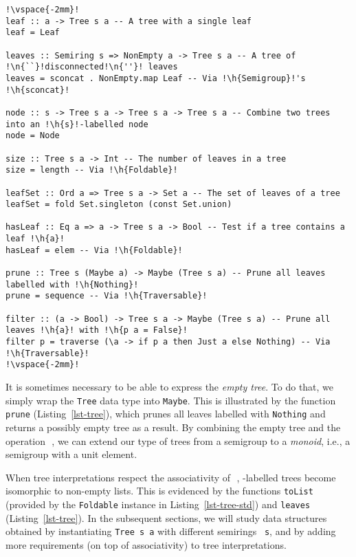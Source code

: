 \documentclass[crc,english]{programming}
\newcommand{\code}[1]{\lstinline[mathescape]|#1|}
\newcommand{\hcode}[1]{{\color{darkblue} \lstinline[keywordstyle={}]|#1|}} %
\newcommand{\h}[1]{{\itshape\color{grayblue}#1}} %
\newcommand{\n}[1]{{\itshape\color{graygreen}#1}} %
\newcommand{\zero}{\raisebox{-0.2mm}{\textcircled{\textsf{0}}}\xspace}
\newcommand{\dia}{\,\text{\raisebox{-0.3mm}{\Large $\diamond$}}\,}
\begin{document}
\begin{lstlisting}[float,label=lst-tree,xleftmargin=0pt,belowskip=-2mm,caption={
    A basic API for constructing and manipulating trees. We use the standard
    module \code{Data.L}\code{ist.N}\code{onEmpty} for representing non-empty
    lists, and \code{Data.S}\code{et} for sets.},captionpos=t]
!\vspace{-2mm}!
leaf :: a -> Tree s a -- A tree with a single leaf
leaf = Leaf

leaves :: Semiring s => NonEmpty a -> Tree s a -- A tree of !\n{``}!disconnected!\n{''}! leaves
leaves = sconcat . NonEmpty.map Leaf -- Via !\h{Semigroup}!'s !\h{sconcat}!

node :: s -> Tree s a -> Tree s a -> Tree s a -- Combine two trees into an !\h{s}!-labelled node
node = Node

size :: Tree s a -> Int -- The number of leaves in a tree
size = length -- Via !\h{Foldable}!

leafSet :: Ord a => Tree s a -> Set a -- The set of leaves of a tree
leafSet = fold Set.singleton (const Set.union)

hasLeaf :: Eq a => a -> Tree s a -> Bool -- Test if a tree contains a leaf !\h{a}!
hasLeaf = elem -- Via !\h{Foldable}!

prune :: Tree s (Maybe a) -> Maybe (Tree s a) -- Prune all leaves labelled with !\h{Nothing}!
prune = sequence -- Via !\h{Traversable}!

filter :: (a -> Bool) -> Tree s a -> Maybe (Tree s a) -- Prune all leaves !\h{a}! with !\h{p a = False}!
filter p = traverse (\a -> if p a then Just a else Nothing) -- Via !\h{Traversable}!
!\vspace{-2mm}!
\end{lstlisting}

\noindent
It is sometimes necessary to be able to express the \emph{empty tree}. To do
that, we simply wrap the \hcode{Tree} data type into \hcode{Maybe}. This is
illustrated by the function \hcode{prune} (Listing~\ref{lst-tree}), which prunes
all leaves labelled with \hcode{Nothing} and returns a possibly empty tree as a
result. By combining the empty tree and the operation \dia, we can extend our
type of trees from a semigroup to a \emph{monoid}, i.e., a semigroup with a unit
element.

When tree interpretations respect the associativity of \dia, \zero-labelled
trees become isomorphic to non-empty lists. This is evidenced by the functions
\hcode{toList} (provided by the \hcode{Foldable} instance in
Listing~\ref{lst-tree-std}) and \hcode{leaves} (Listing~\ref{lst-tree}). In the
subsequent sections, we will study data structures obtained by instantiating
\hcode{Tree s a} with different semirings~\hcode{s}, and by adding more
requirements (on top of associativity) to tree interpretations.
\end{document}
